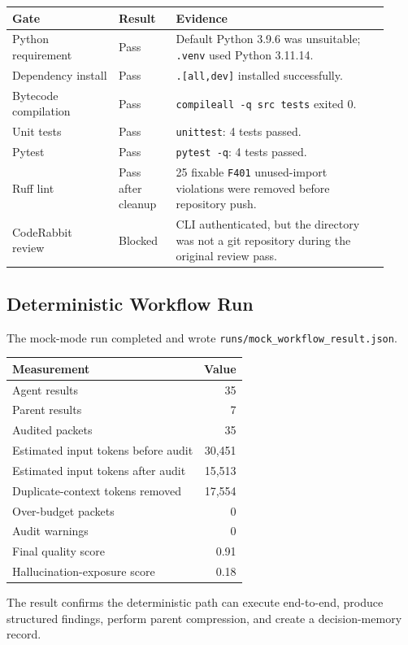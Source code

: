 \documentclass[11pt]{article}
\begin{document}
\begin{longtable}{p{0.26\linewidth}p{0.14\linewidth}p{0.52\linewidth}}
\toprule
Gate & Result & Evidence \\
\midrule
Python requirement & Pass & Default Python 3.9.6 was unsuitable; \texttt{.venv} used Python 3.11.14. \\
Dependency install & Pass & \texttt{.[all,dev]} installed successfully. \\
Bytecode compilation & Pass & \texttt{compileall -q src tests} exited 0. \\
Unit tests & Pass & \texttt{unittest}: 4 tests passed. \\
Pytest & Pass & \texttt{pytest -q}: 4 tests passed. \\
Ruff lint & Pass after cleanup & 25 fixable \texttt{F401} unused-import violations were removed before repository push. \\
CodeRabbit review & Blocked & CLI authenticated, but the directory was not a git repository during the original review pass. \\
\bottomrule
\end{longtable}

\subsection{Deterministic Workflow Run}

The mock-mode run completed and wrote \texttt{runs/mock\_workflow\_result.json}.

\begin{longtable}{lr}
\toprule
Measurement & Value \\
\midrule
Agent results & 35 \\
Parent results & 7 \\
Audited packets & 35 \\
Estimated input tokens before audit & 30,451 \\
Estimated input tokens after audit & 15,513 \\
Duplicate-context tokens removed & 17,554 \\
Over-budget packets & 0 \\
Audit warnings & 0 \\
Final quality score & 0.91 \\
Hallucination-exposure score & 0.18 \\
\bottomrule
\end{longtable}

The result confirms the deterministic path can execute end-to-end, produce structured findings, perform parent compression, and create a decision-memory record.
\end{document}
